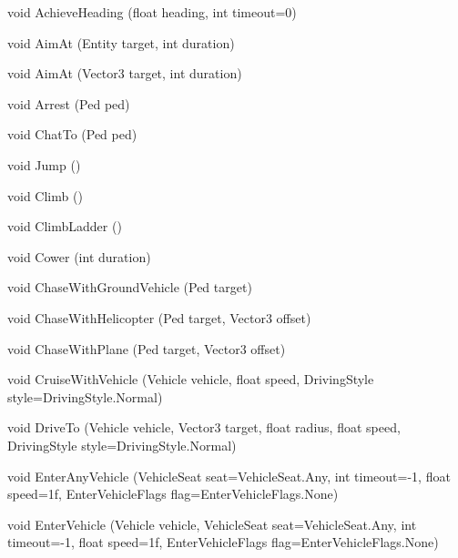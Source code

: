 \documentclass[
  openany]{book}
\newenvironment{Shaded}{\begin{snugshade}}{\end{snugshade}}
\newcommand{\DataTypeTok}[1]{\textcolor[rgb]{0.13,0.29,0.53}{#1}}
\newcommand{\DecValTok}[1]{\textcolor[rgb]{0.00,0.00,0.81}{#1}}
\newcommand{\FunctionTok}[1]{\textcolor[rgb]{0.00,0.00,0.00}{#1}}
\newcommand{\NormalTok}[1]{#1}
\begin{document}
\begin{Shaded}
\begin{Highlighting}[]
\DataTypeTok{void} \FunctionTok{AchieveHeading}\NormalTok{ (}\DataTypeTok{float}\NormalTok{ heading, }\DataTypeTok{int}\NormalTok{ timeout=}\DecValTok{0}\NormalTok{)}
 
\DataTypeTok{void} \FunctionTok{AimAt}\NormalTok{ (Entity target, }\DataTypeTok{int}\NormalTok{ duration)}
 
\DataTypeTok{void} \FunctionTok{AimAt}\NormalTok{ (Vector3 target, }\DataTypeTok{int}\NormalTok{ duration)}
 
\DataTypeTok{void} \FunctionTok{Arrest}\NormalTok{ (Ped ped)}
 
\DataTypeTok{void} \FunctionTok{ChatTo}\NormalTok{ (Ped ped)}
 
\DataTypeTok{void} \FunctionTok{Jump}\NormalTok{ ()}
 
\DataTypeTok{void} \FunctionTok{Climb}\NormalTok{ ()}
 
\DataTypeTok{void} \FunctionTok{ClimbLadder}\NormalTok{ ()}
 
\DataTypeTok{void} \FunctionTok{Cower}\NormalTok{ (}\DataTypeTok{int}\NormalTok{ duration)}
 
\DataTypeTok{void} \FunctionTok{ChaseWithGroundVehicle}\NormalTok{ (Ped target)}
 
\DataTypeTok{void} \FunctionTok{ChaseWithHelicopter}\NormalTok{ (Ped target, Vector3 offset)}
 
\DataTypeTok{void} \FunctionTok{ChaseWithPlane}\NormalTok{ (Ped target, Vector3 offset)}
 
\DataTypeTok{void} \FunctionTok{CruiseWithVehicle}\NormalTok{ (Vehicle vehicle, }\DataTypeTok{float}\NormalTok{ speed, DrivingStyle style=DrivingStyle.}\FunctionTok{Normal}\NormalTok{)}
 
\DataTypeTok{void} \FunctionTok{DriveTo}\NormalTok{ (Vehicle vehicle, Vector3 target, }\DataTypeTok{float}\NormalTok{ radius, }\DataTypeTok{float}\NormalTok{ speed, DrivingStyle style=DrivingStyle.}\FunctionTok{Normal}\NormalTok{)}
 
\DataTypeTok{void} \FunctionTok{EnterAnyVehicle}\NormalTok{ (VehicleSeat seat=VehicleSeat.}\FunctionTok{Any}\NormalTok{, }\DataTypeTok{int}\NormalTok{ timeout=-}\DecValTok{1}\NormalTok{, }\DataTypeTok{float}\NormalTok{ speed=1f, EnterVehicleFlags flag=EnterVehicleFlags.}\FunctionTok{None}\NormalTok{)}
 
\DataTypeTok{void} \FunctionTok{EnterVehicle}\NormalTok{ (Vehicle vehicle, VehicleSeat seat=VehicleSeat.}\FunctionTok{Any}\NormalTok{, }\DataTypeTok{int}\NormalTok{ timeout=-}\DecValTok{1}\NormalTok{, }\DataTypeTok{float}\NormalTok{ speed=1f, EnterVehicleFlags flag=EnterVehicleFlags.}\FunctionTok{None}\NormalTok{)}
 

\end{Highlighting}
\end{Shaded}
\end{document}
